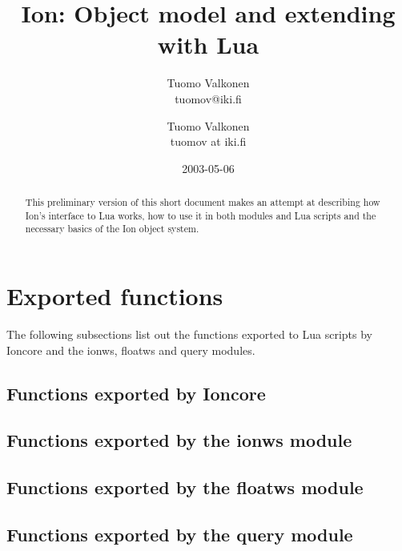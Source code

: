\documentclass[english,a4paper,11pt,oldtoc]{artikel3}
\title{Ion: Object model and extending with Lua}
\author{Tuomo Valkonen \\ tuomov@iki.fi}
\author{Tuomo Valkonen \\ tuomov at iki.fi}
\date{2003-05-06}
\begin{document}
\maketitle

\begin{abstract}
This preliminary version of this short document makes
an attempt at
describing how Ion's interface to Lua works, how to use it in both
modules and Lua scripts and the necessary basics of the Ion object
system.
\end{abstract}

\tableofcontents







\section{Exported functions}
\label{sec:exports}

The following subsections list out the functions exported to Lua scripts
by Ioncore and the ionws, floatws and query modules.

\subsection{Functions exported by Ioncore}



\subsection{Functions exported by the ionws module}



\subsection{Functions exported by the floatws module}



\subsection{Functions exported by the query module}



\printindex
\end{document}
